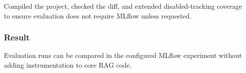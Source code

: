 Compiled the project, checked the diff, and extended disabled-tracking coverage to ensure evaluation does not require MLflow unless requested.

\subsubsection{Result}

Evaluation runs can be compared in the configured MLflow experiment without adding instrumentation to core RAG code.

